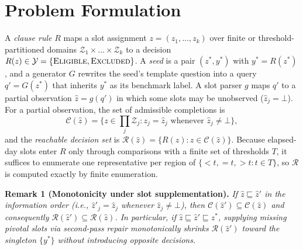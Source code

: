 \documentclass[10pt,twocolumn]{article}
\renewcommand{\_}{\textunderscore\allowbreak}
\begin{document}
\section{Problem Formulation}
\label{sec:problem}
A \emph{clause rule} $R$ maps a slot assignment $z = (z_1,\dots,z_k)$ over finite or threshold-partitioned domains $\mathcal{Z}_1\times\dots\times\mathcal{Z}_k$ to a decision $R(z) \in \mathcal{Y} = \{\textsc{Eligible}, \textsc{Excluded}\}$. A \emph{seed} is a pair $(z^\ast, y^\ast)$ with $y^\ast = R(z^\ast)$, and a generator $G$ rewrites the seed's template question into a query $q' = G(z^\ast)$ that inherits $y^\ast$ as its benchmark label. A slot parser $g$ maps $q'$ to a partial observation $\hat z = g(q')$ in which some slots may be unobserved ($\hat z_j = \bot$). For a partial observation, the set of admissible completions is
\[
\mathcal{C}(\hat z) = \{ z \in \textstyle\prod_j \mathcal{Z}_j : z_j = \hat z_j \text{ whenever } \hat z_j \ne \bot \},
\]
and the \emph{reachable decision set} is $\mathcal{R}(\hat z) = \{R(z) : z \in \mathcal{C}(\hat z)\}$. Because elapsed-day slots enter $R$ only through comparisons with a finite set of thresholds $T$, it suffices to enumerate one representative per region of $\{<t, =t, >t : t\in T\}$, so $\mathcal{R}$ is computed exactly by finite enumeration.

\textbf{Remark 1 (Monotonicity under slot supplementation).} \emph{If $\hat z \sqsubseteq \hat z'$ in the information order (i.e., $\hat z'_j = \hat z_j$ whenever $\hat z_j \ne \bot$), then $\mathcal{C}(\hat z') \subseteq \mathcal{C}(\hat z)$ and consequently $\mathcal{R}(\hat z') \subseteq \mathcal{R}(\hat z)$. In particular, if $\hat z \sqsubseteq \hat z' \sqsubseteq z^\ast$, supplying missing pivotal slots via second-pass repair monotonically shrinks $\mathcal{R}(\hat z')$ toward the singleton $\{y^\ast\}$ without introducing opposite decisions.}
\end{document}
